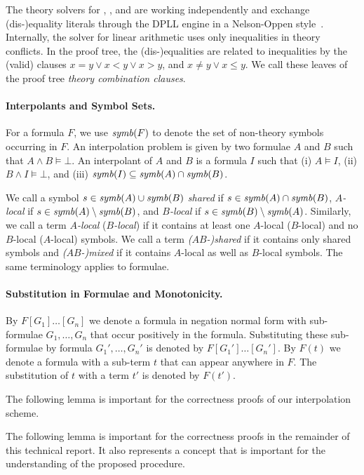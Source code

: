 The theory solvers for \euf, \laq, and \laz are working independently
and exchange (dis-)equality literals through the DPLL engine in a
Nelson-Oppen style~\cite{DBLP:journals/toplas/NelsonO79}.  Internally,
the solver for linear arithmetic uses only inequalities in
theory conflicts.  In the proof tree, the (dis-)equalities are related
to inequalities by the (valid) clauses $x=y \lor x<y \lor x>y$, and
$x\neq y \lor x\leq y$.  We call these leaves of the proof tree
\emph{theory combination clauses}.

\paragraph*{Interpolants and Symbol Sets.}

For a formula $F$, we use $\mathop{\mathit{symb}}(F)$ to denote the set of non-theory
symbols occurring in $F$.  An interpolation problem is given by two
formulae $A$ and $B$ such that $A \land B \models \bot$.  
An interpolant of $A$ and $B$ is a formula $I$ such that 
%
(i) $A \models I$, (ii) $B \land I \models \bot$, and 
(iii) $\mathop{\mathit{symb}}(I) \subseteq \mathop{\mathit{symb}}(A)\cap \mathop{\mathit{symb}}(B)$.

We call a symbol $s \in \mathop{\mathit{symb}}(A)\cup\mathop{\mathit{symb}}(B)$ \emph{shared}
if $s \in \mathop{\mathit{symb}}(A) \cap \mathop{\mathit{symb}}(B)$, \emph{$A$-local} if $s \in
\mathop{\mathit{symb}}(A) \setminus \mathop{\mathit{symb}}(B)$, and \emph{$B$-local} if $s \in
\mathop{\mathit{symb}}(B) \setminus \mathop{\mathit{symb}}(A)$.
Similarly, we call a term \emph{$A$-local} (\emph{$B$-local}) if it
contains at least one $A$-local ($B$-local) and no
$B$-local ($A$-local) symbols.
We call a term \emph{($AB$-)shared} if it contains only shared
symbols and \emph{($AB$-)mixed} if it contains $A$-local as well as $B$-local
symbols. The same terminology applies to formulae.

\paragraph*{Substitution in Formulae and Monotonicity.}
By $F[G_1]\ldots[G_n]$ we denote a formula in negation normal form with
sub-formulae $G_1,\ldots,G_n$ that occur positively in the formula.  Substituting
these sub-formulae by formula $G_1',\ldots,G_n'$ is denoted by $F[G_1']\ldots[G_n']$.  By $F(t)$ we
denote a formula with a sub-term $t$ that can appear anywhere in $F$.  The substitution of $t$ with a
term $t'$ is denoted by $F(t')$.

\begin{tacas}
The following lemma is important for the correctness proofs of our
interpolation scheme.
\end{tacas}
\begin{techreport}
The following lemma is important for the correctness proofs in the remainder
of this technical report. It also represents a concept that is important for
the understanding of the proposed procedure.
\end{techreport}

